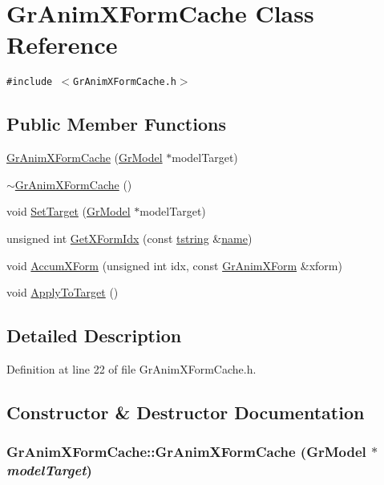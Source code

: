 \hypertarget{class_gr_anim_x_form_cache}{
\section{GrAnimXFormCache Class Reference}
\label{class_gr_anim_x_form_cache}
}
{\tt \#include $<$GrAnimXFormCache.h$>$}

\subsection*{Public Member Functions}
\begin{CompactItemize}
\item 
\hyperlink{class_gr_anim_x_form_cache_49623d60b3c54e9a8439cdd0b669c0ac}{GrAnimXFormCache} (\hyperlink{class_gr_model}{GrModel} $\ast$modelTarget)
\item 
\hyperlink{class_gr_anim_x_form_cache_b5989d0db3961f67a55a73750e16441f}{$\sim$GrAnimXFormCache} ()
\item 
void \hyperlink{class_gr_anim_x_form_cache_982f730a4b0168591c3b809c5a5ac92e}{SetTarget} (\hyperlink{class_gr_model}{GrModel} $\ast$modelTarget)
\item 
unsigned int \hyperlink{class_gr_anim_x_form_cache_2c79a305406c877727e26d7f453cf306}{GetXFormIdx} (const \hyperlink{common__afx_8h_816fa58fd77499b0edb2c69ebe803d5c}{tstring} \&\hyperlink{glext__bak_8h_bb62efe59ccdd153ce42e1a418352209}{name})
\item 
void \hyperlink{class_gr_anim_x_form_cache_a037a5ae12d0b02541a4be1db9f2bba6}{AccumXForm} (unsigned int idx, const \hyperlink{class_gr_anim_x_form}{GrAnimXForm} \&xform)
\item 
void \hyperlink{class_gr_anim_x_form_cache_f2f87fb05ab8bfbf518c4010fc5570cb}{ApplyToTarget} ()
\end{CompactItemize}


\subsection{Detailed Description}


Definition at line 22 of file GrAnimXFormCache.h.

\subsection{Constructor \& Destructor Documentation}
\hypertarget{class_gr_anim_x_form_cache_49623d60b3c54e9a8439cdd0b669c0ac}{
\subsubsection[{GrAnimXFormCache}]{\setlength{\rightskip}{0pt plus 5cm}GrAnimXFormCache::GrAnimXFormCache ({\bf GrModel} $\ast$ {\em modelTarget})}}
\label{class_gr_anim_x_form_cache_49623d60b3c54e9a8439cdd0b669c0ac}




